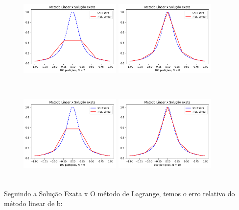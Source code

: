 \documentclass{article}
\begin{document}
\begin{figure}[!htb]
\includegraphics [width=5cm,height=5cm]{LSEb7.png}
\includegraphics [width=5cm,height=5cm]{LSEb8.png}
\includegraphics [width=5cm,height=5cm]{LSEb9.png}
\includegraphics [width=5cm,height=5cm]{LSEb10.png}
\end{figure}

\newpage

\text Seguindo a Solução Exata x O método de Lagrange, temos o erro relativo do método linear de b:
\end{document}
